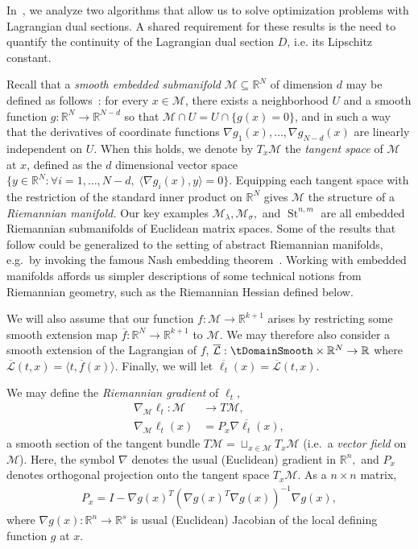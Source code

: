 \documentclass{article}
\numberwithin{equation}{section}
\newcommand{\R}{\mathbb{R}}
\newcommand{\cL}{\mathcal{L}}
\newcommand{\cM}{{\mathcal{M}}}
\DeclareMathOperator{\St}{St}
\newcommand{\demph}[1]{\emph{{\color{RoyalBlue}#1}}}
\begin{document}
In~, we analyze two  algorithms that allow us to solve optimization problems with Lagrangian dual sections.
A shared requirement for these results is the need to quantify the continuity of the Lagrangian dual section $D$, i.e. its Lipschitz constant.

Recall that a \demph{smooth embedded submanifold} $\cM \subseteq \R^N$ of dimension $d$ may be defined as follows~\cite[Def 3.10]{boumal}: for every $x \in \cM$, there exists a neighborhood $U$ and a smooth function $g : \R^N \rightarrow \R^{N-d}$ so that $\cM \cap U = U \cap \{g(x) = 0\}$, and in such a way that the derivatives of coordinate functions $\nabla g_1(x), \dots, \nabla g_{N-d}(x)$ are linearly independent on $U$. When this holds, we denote by $T_x\cM$ the \demph{tangent space} of $\cM$ at $x$, defined as the $d$ dimensional vector space $\{y \in \R^N :\forall i = 1,\dots ,N-d,\; \langle \nabla g_i(x), y\rangle = 0\}$. 
Equipping each tangent space with the restriction of the standard inner product on $\mathbb{R}^N$ gives $\cM$ the structure of a \demph{Riemannian manifold.}
Our key examples $\cM_\lambda , \cM_\sigma ,$ and $\St^{n,m}$ are all embedded Riemannian submanifolds of Euclidean matrix spaces.
Some of the results that follow could be generalized to the setting of abstract Riemannian manifolds, e.g.~by invoking the famous Nash embedding theorem~\cite[Theorem 1, p52]{Nash1956-imbedding-problem}. 
Working with embedded manifolds affords us simpler descriptions of some technical notions from Riemannian geometry, such as the Riemannian Hessian defined below.

We will also assume that our function $f : \cM \rightarrow \R^{k+1}$ arises by restricting some smooth extension map $\overline{f}:\R^N \rightarrow \R^{k+1}$ to $\cM$. We may therefore also consider a smooth extension of the Lagrangian of $f$, $\overline{\cL} : \tDomainSmooth \times \R^N \rightarrow \R$ where $\overline{\cL}(t, x) = \langle t, \overline{f}(x)\rangle$. Finally, we will let $\overline{\ell_t}(x) = \overline{\cL}(t,x)$.


We may define the \demph{Riemannian gradient} of $\ell_t$,
\begin{align*}
\nabla_\cM \ell_t : \cM &\to T \cM , \\
\nabla_\cM \ell_t (x) &= P_x \nabla \overline{\ell_t} (x),
\end{align*}
a smooth section of the tangent bundle $T\cM = \sqcup_{x\in \cM} T_x \cM $ (i.e.~a \demph{vector field} on $\cM$). 
Here, the symbol $\nabla $ denotes the usual (Euclidean) gradient in $\R^n,$ and $P_x$ denotes orthogonal projection onto the tangent space $T_x \cM.$
As a $n\times n$ matrix,
\begin{align*}
P_x= I - \nabla g(x)^T \left( \nabla g(x)^T \nabla g (x) \right)^{-1} \nabla g (x),
\end{align*}
where $\nabla g (x): \R^n \to \R^s$ is usual (Euclidean) Jacobian of the local defining function $g$ at $x.$
\end{document}
